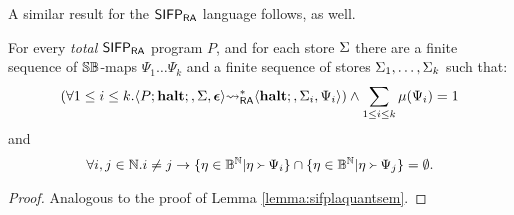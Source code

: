 A similar result for the $\mathsf{SIFP_{{\mathsf{RA}}}}$ language follows, as well.

\begin{lemma}
  \label{lemma:sifpraquantsem}
  For every \emph{total} $\mathsf{SIFP_{{\mathsf{RA}}}}$ program $P$, and for each store $\Sigma$
  there are a finite sequence of $\mathbb{S}\mathbb{B}$-maps $\Psi_1 \ldots \Psi_k$
  and a finite sequence of stores $\Sigma_1, \ldots, \Sigma_k$ such that:
  $$
    \left(\forall 1\le i \le k.\langle P;\mathbf{halt};, \Sigma, \bm{\epsilon}\rangle {\leadsto_{\mathsf{RA}}^{*}} \langle \mathbf{halt};, \Sigma_i,\Psi_i\rangle \right)\land\sum_{1 \le i\le k} \mu(\Psi_i)=1
  $$
  and
  $$
  \forall i, j \in \mathbb{N}. i\neq j \to \{\eta \in \mathbb{B}^{\mathbb{N}} | \eta \Yright \Psi_i\}\cap\{\eta \in \mathbb{B}^{\mathbb{N}} | \eta \Yright \Psi_j\}=\emptyset.
  $$
\end{lemma}
\begin{proof}
  Analogous to the proof of Lemma \ref{lemma:sifplaquantsem}.
\end{proof}





